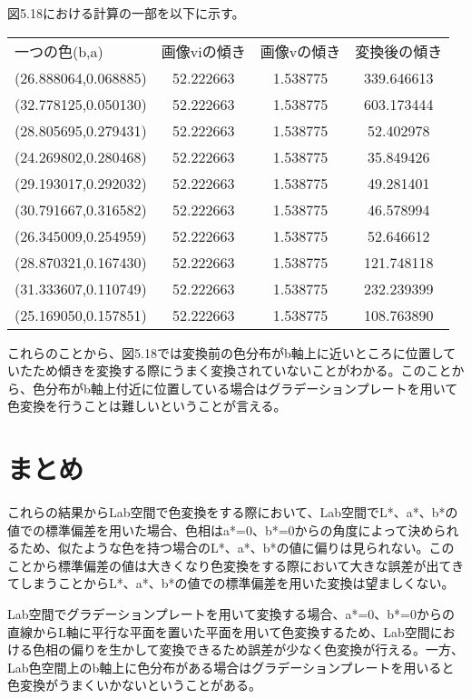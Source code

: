 \newpage
図5.18における計算の一部を以下に示す。
\begin{table}[htb]
  \begin{tabular}{|lccc|}\hline
    一つの色(b,a) & 画像viの傾き &  画像vの傾き & 変換後の傾き \\
    (26.888064,0.068885) &52.222663 &1.538775 &339.646613\\
    (32.778125,0.050130) &52.222663 &1.538775 &603.173444\\
    (28.805695,0.279431) &52.222663 &1.538775 &52.402978\\
    (24.269802,0.280468) &52.222663 &1.538775 &35.849426\\
    (29.193017,0.292032) &52.222663 &1.538775 &49.281401\\
    (30.791667,0.316582) &52.222663 &1.538775 &46.578994\\
    (26.345009,0.254959) &52.222663 &1.538775 &52.646612\\
    (28.870321,0.167430) &52.222663 &1.538775 &121.748118\\
    (31.333607,0.110749) &52.222663 &1.538775 &232.239399\\
    (25.169050,0.157851) &52.222663 &1.538775 &108.763890\\\hline
  \end{tabular}
\end{table}
\par
これらのことから、図5.18では変換前の色分布がb軸上に近いところに位置していたため傾きを変換する際にうまく変換されていないことがわかる。このことから、色分布がb軸上付近に位置している場合はグラデーションプレートを用いて色変換を行うことは難しいということが言える。
\newpage
\section{まとめ}
これらの結果からLab空間で色変換をする際において、Lab空間でL*、a*、b*の値での標準偏差を用いた場合、色相はa*=0、b*=0からの角度によって決められるため、似たような色を持つ場合のL*、a*、b*の値に偏りは見られない。このことから標準偏差の値は大きくなり色変換をする際において大きな誤差が出てきてしまうことからL*、a*、b*の値での標準偏差を用いた変換は望ましくない。\par
Lab空間でグラデーションプレートを用いて変換する場合、a*=0、b*=0からの直線からL軸に平行な平面を置いた平面を用いて色変換するため、Lab空間における色相の偏りを生かして変換できるため誤差が少なく色変換が行える。一方、Lab色空間上のb軸上に色分布がある場合はグラデーションプレートを用いると色変換がうまくいかないということがある。
